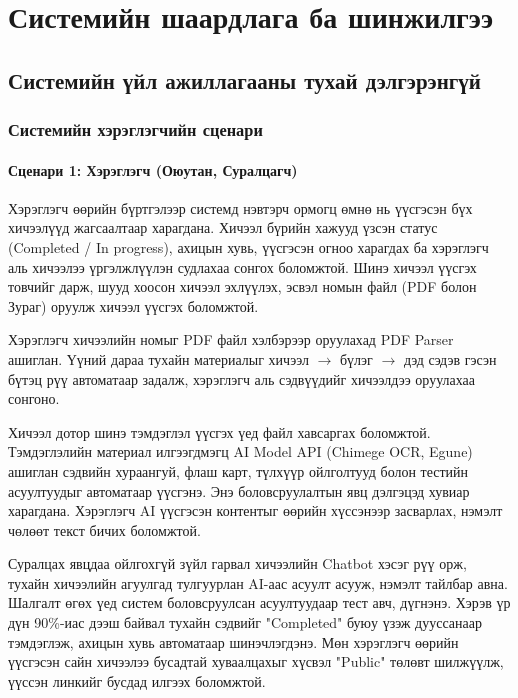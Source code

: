 
\chapter{Системийн шаардлага ба шинжилгээ} %
\label{Chapter2} %

\section{Системийн үйл ажиллагааны тухай дэлгэрэнгүй}

\subsection*{Системийн хэрэглэгчийн сценари}

\subsubsection{Сценари 1: Хэрэглэгч (Оюутан, Суралцагч)}
Хэрэглэгч өөрийн бүртгэлээр системд нэвтэрч ормогц өмнө нь үүсгэсэн бүх хичээлүүд жагсаалтаар харагдана. Хичээл бүрийн хажууд үзсэн статус (Completed / In progress), ахицын хувь, үүсгэсэн огноо харагдах ба хэрэглэгч аль хичээлээ үргэлжлүүлэн судлахаа сонгох боломжтой. Шинэ хичээл үүсгэх товчийг дарж, шууд хоосон хичээл эхлүүлэх, эсвэл номын файл (PDF болон Зураг) оруулж хичээл үүсгэх боломжтой. 

Хэрэглэгч хичээлийн номыг PDF файл хэлбэрээр оруулахад PDF Parser ашиглан. Үүний дараа тухайн материалыг хичээл $\rightarrow$ бүлэг $\rightarrow$ дэд сэдэв гэсэн бүтэц рүү автоматаар задалж, хэрэглэгч аль сэдвүүдийг хичээлдээ оруулахаа сонгоно.

Хичээл дотор шинэ тэмдэглэл үүсгэх үед файл хавсаргах боломжтой. Тэмдэглэлийн материал илгээгдмэгц AI Model API (Chimege OCR, Egune) ашиглан сэдвийн хураангуй, флаш карт, түлхүүр ойлголтууд болон тестийн асуултуудыг автоматаар үүсгэнэ. Энэ боловсруулалтын явц дэлгэцэд хувиар харагдана. Хэрэглэгч AI үүсгэсэн контентыг өөрийн хүссэнээр засварлах, нэмэлт чөлөөт текст бичих боломжтой. 

Суралцах явцдаа ойлгохгүй зүйл гарвал хичээлийн Chatbot хэсэг рүү орж, тухайн хичээлийн агуулгад тулгуурлан AI-аас асуулт асууж, нэмэлт тайлбар авна. Шалгалт өгөх үед систем боловсруулсан асуултуудаар тест авч, дүгнэнэ. Хэрэв үр дүн 90\%-иас дээш байвал тухайн сэдвийг "Completed" буюу үзэж дууссанаар тэмдэглэж, ахицын хувь автоматаар шинэчлэгдэнэ. Мөн хэрэглэгч өөрийн үүсгэсэн сайн хичээлээ бусадтай хуваалцахыг хүсвэл "Public" төлөвт шилжүүлж, үүссэн линкийг бусдад илгээх боломжтой.

